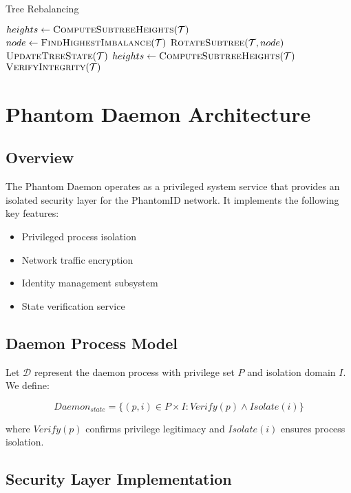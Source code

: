 \documentclass[12pt]{article}
\theoremstyle{definition}
\theoremstyle{remark}
\begin{document}
\begin{algorithm}
\caption{Tree Rebalancing}
\begin{algorithmic}[1]
    \State $heights \gets \textsc{ComputeSubtreeHeights}(\mathcal{T})$
        \State $node \gets \textsc{FindHighestImbalance}(\mathcal{T})$
        \State $\textsc{RotateSubtree}(\mathcal{T}, node)$
        \State $\textsc{UpdateTreeState}(\mathcal{T})$
        \State $heights \gets \textsc{ComputeSubtreeHeights}(\mathcal{T})$
    \EndWhile
    \State $\textsc{VerifyIntegrity}(\mathcal{T})$
\EndProcedure
\end{algorithmic}
\end{algorithm}

\section{Phantom Daemon Architecture}

\subsection{Overview}
The Phantom Daemon operates as a privileged system service that provides an isolated security layer for the PhantomID network. It implements the following key features:

\begin{itemize}
    \item Privileged process isolation
    \item Network traffic encryption
    \item Identity management subsystem
    \item State verification service
\end{itemize}

\subsection{Daemon Process Model}
Let $\mathcal{D}$ represent the daemon process with privilege set $P$ and isolation domain $I$. We define:

\[Daemon_{state} = \{(p, i) \in P \times I : Verify(p) \land Isolate(i)\}\]

where $Verify(p)$ confirms privilege legitimacy and $Isolate(i)$ ensures process isolation.

\subsection{Security Layer Implementation}
\end{document}
